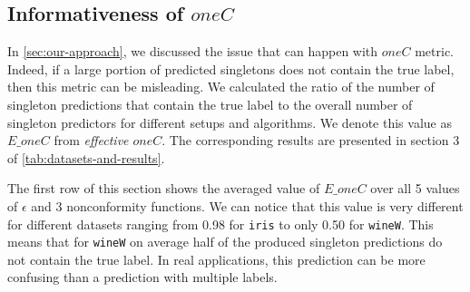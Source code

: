
\subsection{Informativeness of $oneC$}
\label{sec:experiments:eff-oneC}

In \cref{sec:our-approach}, we discussed the issue that can happen with $oneC$ 
metric. Indeed, if a large portion of predicted singletons does not contain the 
true label, then this metric can be misleading.
We calculated the ratio of the number of singleton predictions that contain 
the true label to the overall number of singleton predictors for different
setups and algorithms. We denote this value as $E\_oneC$ from \textit{effective $oneC$}. The corresponding results are presented in 
section 3 of \cref{tab:datasets-and-results}.

The first row of this section shows the averaged value of $E\_oneC$ over all 5
values of $\epsilon$ and 3 nonconformity functions.
We can notice that this value is very different for different datasets ranging
from 0.98 for \verb|iris| to only 0.50 for \verb|wineW|. 
This means that for \verb|wineW| on average half of the produced singleton 
predictions do not contain the true label. In real applications, this
prediction can be more confusing than a prediction with multiple labels.


